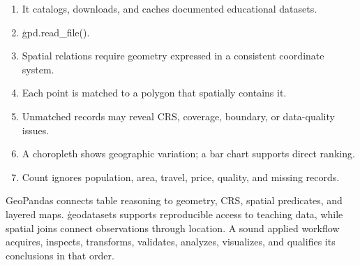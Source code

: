 \begin{enumerate}
    \item It catalogs, downloads, and caches documented educational datasets.
    \item \c{gpd.read_file()}.
    \item Spatial relations require geometry expressed in a consistent coordinate system.
    \item Each point is matched to a polygon that spatially contains it.
    \item Unmatched records may reveal CRS, coverage, boundary, or data-quality issues.
    \item A choropleth shows geographic variation; a bar chart supports direct ranking.
    \item Count ignores population, area, travel, price, quality, and missing records.
\end{enumerate}

\begin{tcolorbox}[title=Part VI summary,colframe=orange,colback=white,arc=2mm]
GeoPandas connects table reasoning to geometry, CRS, spatial predicates, and
layered maps. \c{geodatasets} supports reproducible access to teaching data,
while spatial joins connect observations through location. A sound applied
workflow acquires, inspects, transforms, validates, analyzes, visualizes, and
qualifies its conclusions in that order.
\end{tcolorbox}
